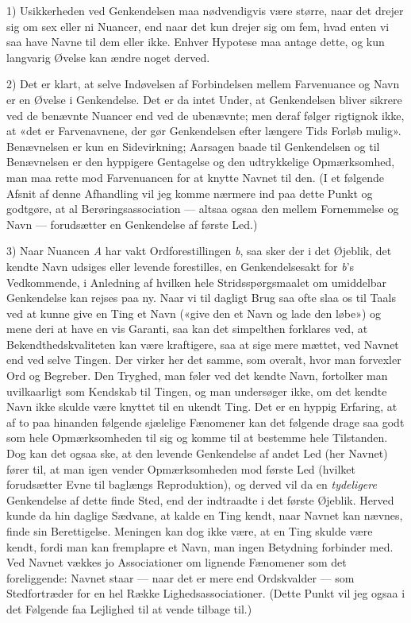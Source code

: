 \documentclass[12pt,a4paper,openany]{book}
\newcommand{\opage}[1]{\marginnote{\footnotesize\textit{[#1]}}}
\begin{document}
1) Usikkerheden ved Genkendelsen maa nødvendigvis være større, naar det drejer
sig om sex eller ni Nuancer, end naar det kun drejer sig om fem, hvad enten vi
saa have Navne til dem eller ikke. Enhver Hypotese maa antage dette, og kun
langvarig Øvelse kan ændre noget derved.

2) Det er klart, at selve Indøvelsen af Forbindelsen mellem Farvenuance og Navn
er en Øvelse i Genkendelse. Det er da intet Under, at Genkendelsen bliver
sikrere ved de benævnte Nuancer end ved de ubenævnte; men deraf følger
rigtignok ikke, at «det er Farvenavnene, der gør Genkendelsen efter længere
Tids Forløb mulig». Benævnelsen er kun en Sidevirkning; Aarsagen baade til
Genkendelsen og til Benævnelsen er den hyppigere Gentagelse og den udtrykkelige
Opmærksomhed, man maa rette mod Farvenuancen for at knytte Navnet til den. (I
et følgende Afsnit af denne Afhandling vil jeg komme nærmere ind paa dette
Punkt og godtgøre, at al Berøringsassociation --- altsaa ogsaa den mellem
Fornemmelse og Navn --- forudsætter en Genkendelse af første Led.)

3) Naar Nuancen \textit{A} har vakt Ordforestillingen \textit{b}, saa sker der
i det Øjeblik, det kendte Navn udsiges eller levende forestilles, en
Genkendelsesakt for \textit{b}'s Vedkommende, i Anledning af hvilken hele
Stridsspørgsmaalet om umiddelbar Genkendelse kan rejses paa ny. Naar vi til
dagligt Brug saa ofte slaa os til Taals ved at kunne give en Ting et Navn
(«give den et Navn og lade den løbe») og mene deri at have en vis Garanti, saa
kan det simpelthen forklares ved, at Bekendthedskvaliteten kan være kraftigere,
saa at sige mere mættet, ved Navnet end ved selve Tingen. Der virker her det
samme, som overalt, hvor man forvexler Ord og Begreber. Den Tryghed, man føler
ved det kendte Navn, fortolker man uvilkaarligt som Kendskab til Tingen, og man
undersøger ikke, om det kendte Navn ikke skulde være knyttet til en ukendt
Ting. Det er en hyppig Erfaring, at af to paa hinanden følgende sjælelige
Fænomener kan det følgende drage saa godt som hele Opmærksomheden til sig og
komme til at bestemme hele Tilstanden. Dog kan det ogsaa ske, at den levende
Genkendelse af andet Led (her Navnet) fører til, at man igen vender
Opmærksomheden mod første Led (hvilket forudsætter Evne til baglængs
Reproduktion), og derved vil da en \emph{tydeligere} Genkendelse af dette finde
Sted, end der indtraadte i det første Øjeblik. Herved kunde da hin daglige
Sædvane, at kalde en Ting kendt, naar Navnet kan nævnes, finde sin
Berettigelse. Meningen kan dog ikke være, at en Ting skulde være kendt, fordi
man kan fremplapre et Navn, man ingen Betydning forbinder med. Ved Navnet
vækkes jo Associationer om lignende Fænomener som det foreliggende:
\setcounter{footnote}{0}%
\opage{35}Navnet staar --- naar det er mere end Ordskvalder --- som
Stedfortræder for en hel Række Lighedsassociationer. (Dette Punkt vil jeg ogsaa
i det Følgende faa Lejlighed til at vende tilbage til.)
\end{document}
